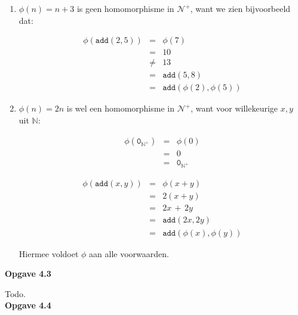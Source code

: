 \documentclass[a4paper,11pt]{article}
\begin{document}
\begin{enumerate}

\item %

  $\phi(n) = n+3$ is geen homomorphisme in $\mathcal{N}^{+}$, want we zien
  bijvoorbeeld dat:

  \begin{eqnarray*}
    \phi(\texttt{add}(2,5)) & = & \phi(7) \\
                          & = & 10 \\
                          & \ne & 13 \\
                          & = & \texttt{add}(5,8) \\
                          & = & \texttt{add}(\phi(2),\phi(5))
  \end{eqnarray*}

\item %

  $\phi(n) = 2n$ is wel een homomorphisme in $\mathcal{N}^{+}$, want voor
  willekeurige $x,y$ uit $\mathbb{N}$:

  \begin{eqnarray*}
    \phi(\texttt{0}_{\mathbb{N}^{+}}) & = & \phi(0) \\
                                    & = & 0 \\
                                    & = & \texttt{0}_{\mathbb{N}^{+}}
  \end{eqnarray*}

  \begin{eqnarray*}
    \phi(\texttt{add}(x,y)) & = & \phi(x+y) \\
                          & = & 2(x+y) \\
                          & = & 2x \, + \, 2y \\
                          & = & \texttt{add}(2x, 2y) \\
                          & = & \texttt{add}(\phi(x), \phi(y))
  \end{eqnarray*}

  Hiermee voldoet $\phi$ aan alle voorwaarden.\\[2em]

\end{enumerate}


{\bf Opgave 4.3}

Todo.\\[2em]


{\bf Opgave 4.4}
\end{document}

